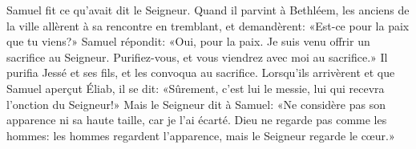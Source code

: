 Samuel fit ce qu’avait dit le Seigneur.
Quand il parvint à Bethléem,
	les anciens de la ville allèrent à sa rencontre en tremblant, et demandèrent:
	«Est-ce pour la paix que tu viens?»
Samuel répondit: «Oui, pour la paix.
	Je suis venu offrir un sacrifice au Seigneur.
	Purifiez-vous, et vous viendrez avec moi au sacrifice.»
Il purifia Jessé et ses fils, et les convoqua au sacrifice.
Lorsqu’ils arrivèrent et que Samuel aperçut Éliab,
	il se dit: «Sûrement, c’est lui le messie, lui qui recevra l’onction du Seigneur!»
Mais le Seigneur dit à Samuel:
	«Ne considère pas son apparence ni sa haute taille, car je l’ai écarté.
Dieu ne regarde pas comme les hommes:
	les hommes regardent l’apparence, mais le Seigneur regarde le cœur.»
